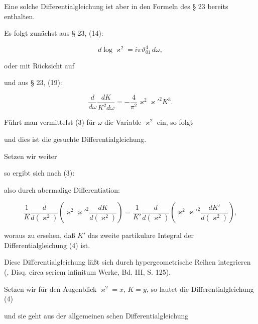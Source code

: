 
Eine solche Differentialgleichung ist aber in den Formeln des § 23 bereits enthalten.

Es folgt zunächst aus § 23, (14):

\[
d\log \varkappa^2 = i\pi\vartheta_{01}^4\,d\omega,
\]

oder mit Rücksicht auf



und aus § 23, (19):

\[
\frac{d}{d\omega}\frac{dK}{K^2d\omega} = -\frac{4}{\pi^2}\varkappa^2\varkappa'^2K^3.
\]

Führt man vermittelst (3) für $\omega$ die Variable $\varkappa^2$ ein, so folgt


und dies ist die gesuchte Differentialgleichung.

Setzen wir weiter



so ergibt sich nach (3):


also durch abermalige Differentiation:

\[
\frac1K\frac{d}{d(\varkappa^2)}\left(\varkappa^2\varkappa'^2\frac{dK}{d(\varkappa^2)}\right) = \frac{1}{K'}\frac{d}{d(\varkappa^2)}\left(\varkappa^2\varkappa'^2\frac{dK'}{d(\varkappa^2)}\right),
\]

woraus zu ersehen, daß $K'$ das zweite partikulare Integral der Differentialgleichung (4) ist.

Diese Differentialgleichung läßt sich durch hypergeometrische Reihen integrieren (, Disq. circa seriem infinitum Werke, Bd. III, S. 125).

Setzen wir für den Augenblick $\varkappa^2 = x$, $K = y$, so lautet die Differentialgleichung (4)


und sie geht aus der allgemeinen schen Differentialgleichung

